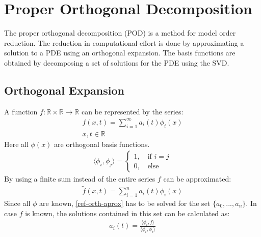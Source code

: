 \section{Proper Orthogonal Decomposition}
The proper orthogonal decomposition (POD) is a method for model order reduction.
The reduction in computational effort is done by approximating a solution to a PDE using an orthogonal expansion.
The basis functions are obtained by decomposing a set of solutions for the PDE using the SVD.
\subsection{Orthogonal Expansion}
A function \(f: \mathbb{R} \times \mathbb{R} \rightarrow \mathbb{R}\) can be represented by the series:
\begin{gather}
f(x, t) = \sum_{i = 1}^{\infty}a_i(t)\phi_i(x) \\
x, t \in \mathbb{R} \label{ref-orth-exp}
\end{gather}
Here all \(\phi(x)\) are orthogonal basis functions.
\begin{gather}
\langle\phi_i, \phi_j\rangle =\begin{cases}
1, \quad \text{if } i = j \\
0, \quad \text{else}
\end{cases} \label{phi-orth}
\end{gather}
By using a finite sum instead of the entire  series \(f\) can be approximated:
\begin{gather}
\tilde{f}(x, t) = \sum_{i = 1}^{n}a_{i}(t)\phi_{i}(x) \label{ref-orth-aprox}
\end{gather}
Since all \(\phi\) are known, \ref{ref-orth-aprox} has to be solved for the set \(\{a_0, ..., a_n\}\).
In case \(f\) is known, the solutions contained in this set can be calculated as:
\begin{gather}
a_i(t) = \frac{\langle \phi_i, f \rangle}{\langle \phi_i, \phi_i \rangle} \label{sol-ai}
\end{gather}
\cite{Gustafsson2011e}
